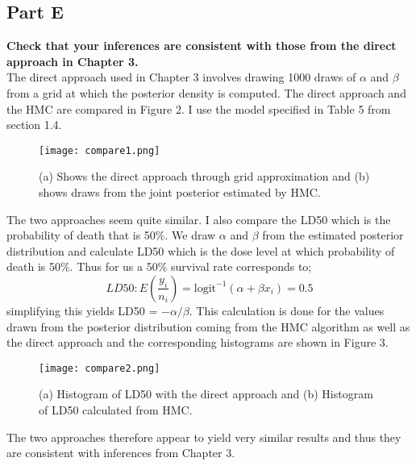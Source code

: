 \documentclass{article}
\begin{document}
\subsection{Part E}
\textbf{Check that your inferences are consistent with those from the direct approach in Chapter 3.}\\
The direct approach used in Chapter 3 involves drawing 1000 draws of $\alpha$ and $\beta$ from a grid at which the posterior density is computed. The direct approach and the HMC are compared in Figure 2. I use the model specified in Table 5 from section 1.4.
\begin{figure}[H]
\centering
\texttt{[image: compare1.png]}
\caption{(a) Shows the direct approach through grid approximation and (b) shows draws from the joint posterior estimated by HMC.}
\end{figure}
The two approaches seem quite similar.
I also compare the LD50 which is the probability of death that is 50\%.
We draw $\alpha$ and $\beta$ from the estimated posterior distribution and calculate LD50 which is the dose level at which probability of death is 50\%. Thus for us a 50\% survival rate corresponds to;
$$LD50 : E(\frac{y_i}{n_i}) = \text{logit}^{-1}(\alpha + \beta x_i) = 0.5$$
simplifying this yields LD50 = $-\alpha/\beta$. This calculation is done for the values drawn from the posterior distribution coming from the HMC algorithm as well as the direct approach and the corresponding histograms are shown in Figure 3.
\begin{figure}[H]
\centering
\texttt{[image: compare2.png]}
\caption{(a) Histogram of LD50 with the direct approach and (b) Histogram of LD50 calculated from HMC.}
\end{figure}
The two approaches therefore appear to yield very similar results and thus they are consistent with inferences from Chapter 3.
\end{document}
